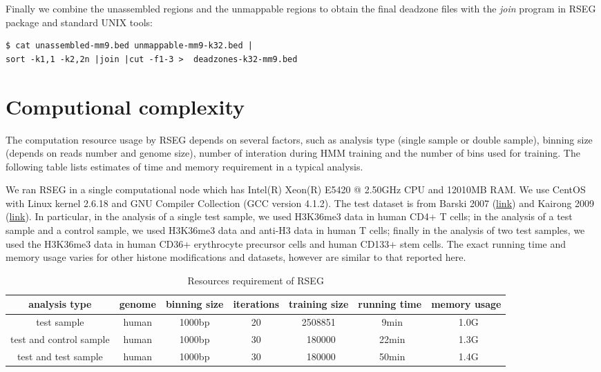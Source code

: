 \documentclass[11pt]{report}
\begin{document}
Finally we combine the unassembled regions and the unmappable regions to obtain
the final deadzone files with the \textit{join} program in RSEG package  and
standard UNIX tools: 

\begin{verbatim}
$ cat unassembled-mm9.bed unmappable-mm9-k32.bed | 
sort -k1,1 -k2,2n |join |cut -f1-3 >  deadzones-k32-mm9.bed
\end{verbatim}

\section{Computional complexity}
\label{sec:comp-compl}
The computation resource usage by RSEG depends on several factors,
such as analysis type (single sample or double sample), binning size
(depends on reads number and genome size), number of interation during
HMM training and the number of bins used for training. The following
table lists estimates of time and memory requirement in a typical
analysis. 

We ran RSEG in a single computational node which has Intel(R) Xeon(R)
E5420 @ 2.50GHz CPU and 12010MB RAM. We use CentOS with Linux kernel
2.6.18 and GNU Compiler Collection (GCC version 4.1.2). The test
dataset is from Barski 2007
(\href{http://dir.nhlbi.nih.gov/papers/lmi/epigenomes/hgtcell.aspx}{link})
and Kairong 2009
(\href{http://dir.nhlbi.nih.gov/papers/lmi/epigenomes/hghscmethylation.aspx}{link}). In
particular, in the analysis of a single test sample, we used H3K36me3
data in human CD4+ T cells; in the analysis of a test sample and a
control sample, we used H3K36me3 data and anti-H3 data in human T
cells; finally in the analysis of two test samples, we used the
H3K36me3 data in human CD36+ erythrocyte precursor cells and human
CD133+ stem cells. The exact running time and memory usage varies for
other histone modifications and datasets, however are similar to that
reported here.

 
\begin{table}[th]
  \centering
  \begin{tabular}{c c c c c c c }
    \hline
    analysis type & genome & binning size & iterations & training size
    & running time & memory usage\\
    \hline
    test sample & human & 1000bp & 20 & 2508851 & ~9min & ~1.0G \\
    test and control sample & human & 1000bp & 30 & ~180000 & ~22min & ~1.3G \\
    test and test sample & human & 1000bp & 30 & ~180000 & ~50min &
    ~1.4G \\
   \hline
  \end{tabular}
  \caption{Resources requirement of RSEG}
  \label{tab:format-bin-diff}
\end{table}
\end{document}
